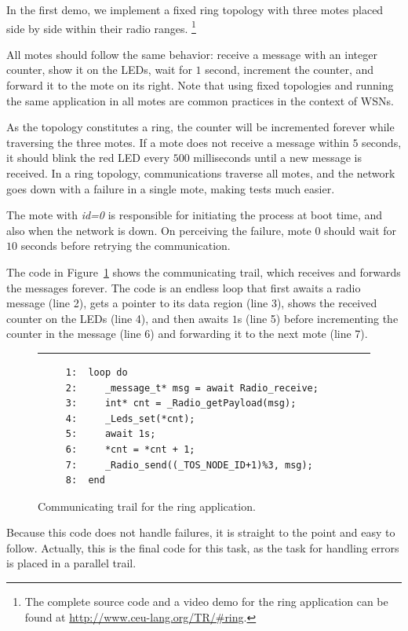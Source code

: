 \documentclass[11pt,a4paper]{article}
\newcommand{\2}{\;\;}
\newcommand{\5}{\;\;\;\;\;}
\begin{document}
In the first demo, we implement a fixed ring topology with three motes placed 
side by side within their radio ranges.%
\footnote{The complete source code and a video demo for the ring application 
can be found at \url{http://www.ceu-lang.org/TR/\#ring}.}

All motes should follow the same behavior: receive a message with an integer 
counter, show it on the LEDs, wait for $1$ second, increment the counter, and 
forward it to the mote on its right.
Note that using fixed topologies and running the same application in all motes 
are common practices in the context of WSNs.

As the topology constitutes a ring, the counter will be incremented forever 
while traversing the three motes.
If a mote does not receive a message within $5$ seconds, it should blink the 
red LED every $500$ milliseconds until a new message is received.
In a ring topology, communications traverse all motes, and the network goes 
down with a failure in a single mote, making tests much easier.

The mote with \emph{id=0} is responsible for initiating the process at boot 
time, and also when the network is down.
On perceiving the failure, mote $0$ should wait for $10$ seconds before 
retrying the communication.

The code in Figure~\ref{lst:demos:ring:1} shows the communicating trail, which 
receives and forwards the messages forever.
The code is an endless loop that first awaits a radio message (line 2), gets a 
pointer to its data region (line 3), shows the received counter on the LEDs 
(line 4), and then awaits $1$s (line 5) before incrementing the counter in the 
message (line 6) and forwarding it to the next mote (line 7).

\begin{figure}[h]
\rule{15cm}{0.37pt}
{\small
\begin{verbatim}
     1:  loop do
     2:     _message_t* msg = await Radio_receive;
     3:     int* cnt = _Radio_getPayload(msg);
     4:     _Leds_set(*cnt);
     5:     await 1s;
     6:     *cnt = *cnt + 1;
     7:     _Radio_send((_TOS_NODE_ID+1)%3, msg);
     8:  end
\end{verbatim}
}
\caption{ Communicating trail for the ring application.
\label{lst:demos:ring:1}
}
\end{figure}

Because this code does not handle failures, it is straight to the point and 
easy to follow.
Actually, this is the final code for this task, as the task for handling errors 
is placed in a parallel trail.
\end{document}
